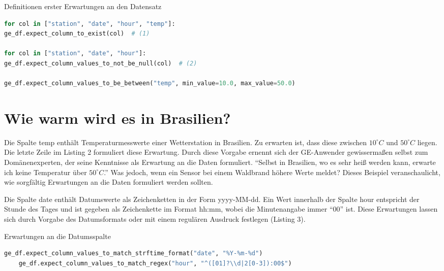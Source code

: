 \begin{code}	
  \caption{Definitionen erster Erwartungen an den Datensatz}
	
\begin{lstlisting}[language=Python]
for col in ["station", "date", "hour", "temp"]:
ge_df.expect_column_to_exist(col)  # (1)
	
for col in ["station", "date", "hour"]:
ge_df.expect_column_values_to_not_be_null(col)  # (2)
	
ge_df.expect_column_values_to_be_between("temp", min_value=10.0, max_value=50.0)
\end{lstlisting}
\end{code}
		
\section{Wie warm wird es in Brasilien?}
	
Die Spalte temp enthält Temperaturmesswerte einer Wetterstation in Brasilien. Zu erwarten ist, dass diese zwischen $10^\circ C$ und $50^\circ C$ liegen. Die letzte Zeile im Listing 2 formuliert diese Erwartung. Durch diese Vorgabe ernennt sich der GE-Anwender gewissermaßen selbst zum Domänenexperten, der seine Kenntnisse als Erwartung an die Daten formuliert. ``Selbst in Brasilien, wo es sehr heiß werden kann, erwarte ich keine Temperatur über $50^\circ C$.'' Was jedoch, wenn ein Sensor bei einem Waldbrand höhere Werte meldet? Dieses Beispiel veranschaulicht, wie sorgfältig Erwartungen an die Daten formuliert werden sollten.
	
Die Spalte date enthält Datumswerte als Zeichenketten in der Form yyyy-MM-dd. Ein Wert innerhalb der Spalte hour entspricht der Stunde des Tages und ist gegeben als Zeichenkette im Format hh:mm, wobei die Minutenangabe immer ``00'' ist. Diese Erwartungen lassen sich durch Vorgabe des Datumsformats oder mit einem regulären Ausdruck festlegen (Listing 3).

\begin{code}
	
	\caption{Erwartungen an die Datumsspalte}
	
\begin{lstlisting}[language=Python]
	ge_df.expect_column_values_to_match_strftime_format("date", "%Y-%m-%d")
	ge_df.expect_column_values_to_match_regex("hour", "^([01]?\\d|2[0-3]):00$")
\end{lstlisting}
\end{code}
	
